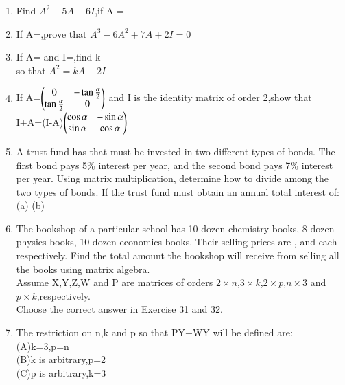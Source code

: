 \begin{enumerate}[label=\arabic*.,ref=\thesubsection.\theenumi]
\item Find $A^{2}-5A+6I$,if A = \\
\item If A=,prove that $A^3-6A^2+7A+2I=0$\\
\item If A= and I=,find k\\
 so that $A^2=kA-2I$\\
\item If A=$\begin{pmatrix}0 &-\tan\frac{\alpha}{2}\\  \tan\frac{\alpha}{2} &0\end{pmatrix}$ and I is the identity matrix of order 2,show that \\I+A=(I-A)$\begin{pmatrix}\cos\alpha &-\sin\alpha\\\sin\alpha &\cos\alpha\end{pmatrix}$\\
\item A trust fund has  that must be invested in two different types of bonds.
The first bond pays 5\% interest per year, and the second bond pays 7\% interest
per year. Using matrix multiplication, determine how to divide  among
the two types of bonds. If the trust fund must obtain an annual total interest of:\\
(a)  (b)\\
\item The bookshop of a particular school has 10 dozen chemistry books, 8 dozen
physics books, 10 dozen economics books. Their selling prices are ,  and
  each respectively. Find the total amount the bookshop will receive from
selling all the books using matrix algebra.\\
Assume X,Y,Z,W and P are matrices of orders $2\times n$,$3 \times k$,$2\times p$,$n\times 3$ and $p\times k$,respectively.\\
Choose the correct answer in Exercise 31 and 32.\\
\item The restriction on n,k and p so that PY+WY will be defined are:\\
(A)k=3,p=n\\
 (B)k is arbitrary,p=2 \\
 (C)p is arbitrary,k=3 \\

\end{enumerate}
